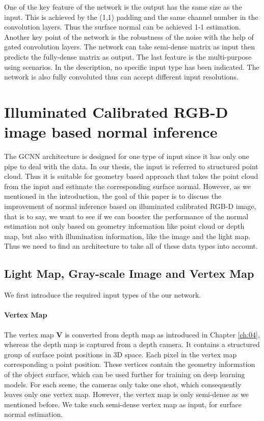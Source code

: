 One of the key feature of the network is the output has the same size as the input. This is achieved by the (1,1) padding and the same channel number in the convolution layers. Thus the surface normal can be achieved 1-1 estimation. Another key point of the network is the robustness of the noise with the help of gated convolution layers. The network can take semi-dense matrix as input then predicts the fully-dense matrix as output. The last feature is the multi-purpose using scenarios. In the description, no specific input type has been indicated. 
The network is also fully convoluted thus can accept different input resolutions. 


\section{Illuminated Calibrated RGB-D image based normal inference}
The GCNN architecture is designed for one type of input since it has only one pipe to deal with the data. In our thesis, the input is referred to structured point cloud. Thus it is suitable for geometry based approach that takes the point cloud from the input and estimate the corresponding surface normal. However, as we mentioned in the introduction, the goal of this paper is to discuss the improvement of normal inference based on illuminated calibrated RGB-D image, that is to say, we want to see if we can booster the performance of the normal estimation not only based on geometry information like point cloud or depth map, but also with illumination information, like the image and the light map. Thus we need to find an architecture to take all of these data types into account. 


\subsection{Light Map, Gray-scale Image and Vertex Map}
\label{sec:lightmap}
We first introduce the required input types of the our network.

\paragraph{Vertex Map}
The vertex map $ \textbf{V} $ is converted from depth map as introduced in Chapter \ref{ch:04}, whereas the depth map is captured from a depth camera. It contains a structured group of surface point positions in 3D space. Each pixel in the vertex map corresponding a point position. These vertices contain the geometry information of the object surface, which can be used further for training on deep learning models. For each scene,  the cameras only take one shot, which consequently leaves only one vertex map. However, the vertex map is only semi-dense as we mentioned before. We take such semi-dense vertex map as input, for surface normal estimation.

